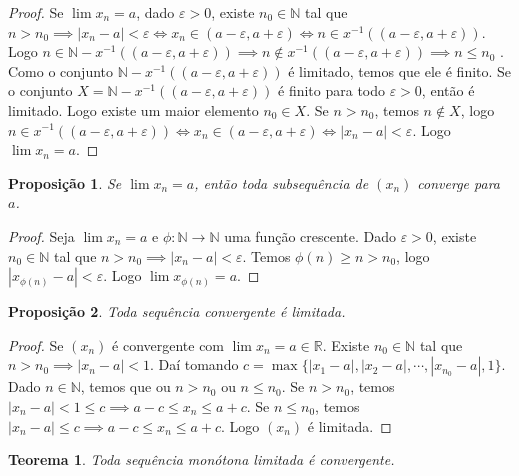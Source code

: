 \documentclass{article}
\theoremstyle{plain}
\newtheorem{prop}{Proposição}[section]
\newtheorem{teo}{Teorema}
\theoremstyle{definition}
\theoremstyle{remark}
\begin{document}
\begin{proof}
	Se $\lim x_n = a$, dado $\varepsilon >0$, existe $n_0 \in \mathbb{N}$ tal que $n > n_0 \implies |x_n - a| < \varepsilon \iff x_n \in (a-\varepsilon, a+\varepsilon) \iff n \in x^{-1}((a-\varepsilon, a+\varepsilon))$. Logo $n \in \mathbb{N} - x^{-1}( (a-\varepsilon, a+\varepsilon)) \implies n \not \in x^{-1}( (a-\varepsilon, a+\varepsilon)) \implies n \leq n_0$ .  Como o conjunto $\mathbb{N} - x^{-1}( (a - \varepsilon, a+\varepsilon))$ é limitado, temos que ele é finito.
	Se o conjunto $ X = \mathbb{N} - x^{-1}( (a - \varepsilon, a+\varepsilon))$ é finito para todo $\varepsilon >0$, então é limitado.  Logo existe um maior elemento $n_0 \in  X$. Se $n > n_0$,  temos $n \not \in X$, logo $n \in x^{-1}((a-\varepsilon, a+\varepsilon)) \iff x_n \in (a-\varepsilon, a+\varepsilon) \iff |x_n -a| < \varepsilon$. Logo $\lim x_n = a$.
\end{proof}
\begin{prop}
	Se $\lim x_n = a$, então toda subsequência de $(x_n)$ converge para $a$.
\end{prop}
\begin{proof}
	Seja $\lim x_n = a$ e $\phi: \mathbb{N} \to \mathbb{N}$ uma função crescente. Dado $\varepsilon>0$, existe $n_0 \in \mathbb{N}$ tal que $n> n_0 \implies |x_n -a| < \varepsilon$. Temos $\phi(n) \geq  n > n_0$, logo $|x_{\phi(n)} -a| < \varepsilon$. Logo $\lim x_{\phi(n)}  = a$.
\end{proof}
\begin{prop}
	Toda sequência convergente é limitada.
\end{prop}
\begin{proof}
	Se $(x_n)$ é convergente com $\lim x_n = a\in\mathbb{R}$. Existe $n_0 \in \mathbb{N}$ tal que $n>n_0 \implies |x_n - a|<1$. Daí tomando $c = \max\{|x_1 - a|, |x_2-a|, \cdots, |x_{n_0} -a |, 1\}$. Dado $n\in \mathbb{N}$, temos que ou $n>n_0$ ou $n\leq n_0$. Se $n>n_0$, temos $|x_n -a| < 1 \leq c \implies a-c \leq x_n \leq a+c$. Se $n\leq n_0$, temos $|x_n-a| \leq c \implies a-c \leq x_n \leq a+c$. Logo $(x_n)$ é limitada.
\end{proof}
\begin{teo}
	Toda sequência monótona limitada é convergente.
\end{teo}
\end{document}
